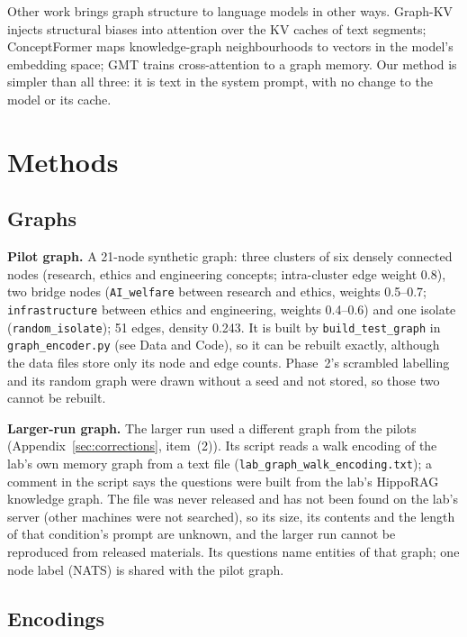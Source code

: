 \documentclass[11pt,a4paper]{article}
\begin{document}
Other work brings graph structure to language models in other ways. Graph-KV \citep{wang2025graphkv} injects structural biases into attention over the KV caches of text segments; ConceptFormer \citep{barmettler2025conceptformer} maps knowledge-graph neighbourhoods to vectors in the model's embedding space; GMT \citep{liu2025gmt} trains cross-attention to a graph memory. Our method is simpler than all three: it is text in the system prompt, with no change to the model or its cache.

\section{Methods}

\subsection{Graphs}

\textbf{Pilot graph.} A 21-node synthetic graph: three clusters of six densely connected nodes (research, ethics and engineering concepts; intra-cluster edge weight 0.8), two bridge nodes (\texttt{AI\_welfare} between research and ethics, weights 0.5--0.7; \texttt{infrastructure} between ethics and engineering, weights 0.4--0.6) and one isolate (\texttt{random\_isolate}); 51 edges, density 0.243. It is built by \texttt{build\_test\_graph} in \texttt{graph\_encoder.py} (see Data and Code), so it can be rebuilt exactly, although the data files store only its node and edge counts. Phase~2's scrambled labelling and its random graph were drawn without a seed and not stored, so those two cannot be rebuilt.

\textbf{Larger-run graph.} The larger run used a different graph from the pilots (Appendix~\ref{sec:corrections}, item~(2)). Its script reads a walk encoding of the lab's own memory graph from a text file (\nolinkurl{lab_graph_walk_encoding.txt}); a comment in the script says the questions were built from the lab's HippoRAG knowledge graph. The file was never released and has not been found on the lab's server (other machines were not searched), so its size, its contents and the length of that condition's prompt are unknown, and the larger run cannot be reproduced from released materials. Its questions name entities of that graph; one node label (NATS) is shared with the pilot graph.

\subsection{Encodings}
\end{document}
